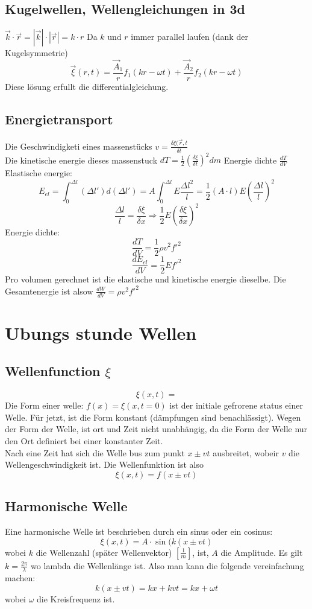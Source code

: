 \documentclass{article}
\begin{document}
\subsection{Kugelwellen, Wellengleichungen in 3d}$\vec{k}\cdot\vec{r}= |\vec{k}|\cdot|\vec{r}|=k\cdot r$ Da $k$ und $r$ immer parallel laufen (dank der Kugelsymmetrie)
\[\vec{\xi}(r,t)=\frac{\vec{A}_1}{r}f_1(kr-\omega t)+\frac{\vec{A}_2}{r}f_2(kr-\omega t)\]
Diese lösung erfullt die differentialgleichung.
\subsection{Energietransport} Die Geschwindigketi eines massenstücks $v=\frac{\delta \xi(\vec{r},t}{\delta t}$\\
Die kinetische energie dieses massenstuck $dT=\frac{1}{2}\left(\frac{\delta \xi}{\delta t}\right)^2 dm$
Energie dichte $\frac{dT}{dV}$
\\
Elastische energie:
\[E_{el}=\int_0^{\Delta l}(\Delta l')d(\Delta l')=A\int_0^{\Delta l}E\frac{\Delta l^2}{l}=\frac{1}{2}(A\cdot l)E\left(\frac{\Delta l}{l}\right)^2\]
\[\frac{\Delta l}{l}=\frac{\delta \xi}{\delta x}\Rightarrow\frac{1}{2}E\left(\frac{\delta \xi}{\delta x}\right)^2\]
Energie dichte:
\[\frac{dT}{dV}=\frac{1}{2}\rho v^2 f'^2\]
\[\frac{dE_{el}}{dV}=\frac{1}{2}Ef'^2\]
Pro volumen gerechnet ist die elastische und kinetische energie dieselbe. Die Gesamtenergie ist alsow $\frac{dW}{dV}=\rho v^2f'^2$\\
\section{Ubungs stunde Wellen}
\subsection{Wellenfunction $\xi$}
\[\xi(x,t)=\]
Die Form einer welle: $f(x)=\xi(x,t=0)$ ist der initiale gefrorene status einer Welle. Für jetzt, ist die Form konstant (dämpfungen sind benachlässigt). Wegen der Form der Welle, ist ort und Zeit nicht unabhängig, da die Form der Welle nur den Ort definiert bei einer konstanter Zeit.\\
Nach eine Zeit hat sich die Welle bus zum punkt $x\pm vt$ ausbreitet, wobeir $v$ die Wellengeschwindigkeit ist. Die Wellenfunktion ist also\[\xi(x,t)=f(x\pm vt)\]
\subsection{Harmonische Welle}
Eine harmonische Welle ist beschrieben durch ein sinus oder ein cosinus:\[\xi(x,t)=A\cdot\sin(k(x\pm vt)\] wobei $k$ die Wellenzahl (später Wellenvektor) $\left[\frac{1}{m}\right]$, ist, $A$ die Amplitude. Es gilt $k=\frac{2\pi}{\lambda}$ wo lambda die Wellenlänge ist. Also man kann die folgende vereinfachung machen:
\[k(x\pm vt)=kx+kvt=kx+\omega t\]
wobei $\omega$ die Kreisfrequenz ist.\\
\end{document}

